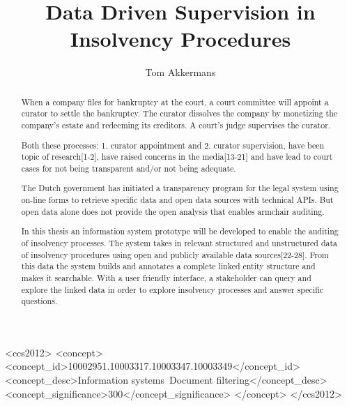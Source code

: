 \documentclass[sigconf]{acmart}
\begin{document}

\pagebreak
\title{Data Driven Supervision in Insolvency Procedures}

\author{Tom Akkermans}


\begin{abstract}
When a company files for bankruptcy at the court, a court committee will appoint a curator to settle the bankruptcy. The curator dissolves the company by monetizing the company's estate and redeeming its creditors. A court's judge supervises the curator. 

Both these processes: 1. curator appointment and 2. curator supervision, have been topic of research[1-2], have raised concerns in the media[13-21] and have lead to court cases for not being transparent and/or not being adequate.

The Dutch government has initiated a transparency program for the legal system using on-line forms to retrieve specific data and open data sources with technical APIs. But open data alone does not provide the open analysis that enables armchair auditing.

In this thesis an information system prototype will be developed to enable the auditing of insolvency processes. The system takes in relevant structured and unstructured data of insolvency procedures using open and publicly available data sources[22-28]. From this data the system builds and annotates a complete linked entity structure and makes it searchable. With a user friendly interface, a stakeholder can query and explore the linked data in order to explore insolvency processes and answer specific questions.
\end{abstract}

%
%
\begin{CCSXML}
<ccs2012>
	<concept>
		<concept_id>10002951.10003317.10003347.10003349</concept_id>
		<concept_desc>Information systems~Document filtering</concept_desc>
		<concept_significance>300</concept_significance>
	</concept>
</ccs2012>
\end{CCSXML}


\maketitle




%
\end{document}
